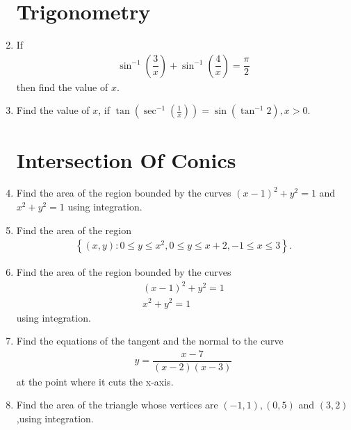 \documentclass[12pt,-letter paper]{article}
\providecommand{\cbrak}[1]{\ensuremath{\left\{#1\right\}}}
\providecommand{\brak}[1]{\ensuremath{\left(#1\right)}}
\begin{document}
\begin{enumerate}
\section{Trigonometry}

\item  If
\begin{align*}
 \sin^{-1} \brak{\dfrac{3}{x}} + \sin^{-1}\brak{\dfrac{4}{x}}=\dfrac{\pi}{2} 
\end{align*}
then find the value of $x$. 

\item Find the value of $x$, if $\tan \brak{\sec^{-1}\brak{\frac{1}{x}}} = \sin \brak{\tan^{-1}{2}},x > 0$.

\section{Intersection Of Conics}

\item Find the area of the region bounded by the curves $\brak{x-1}^{2} +y^{2} = 1$ and $ x^{2}+y^{2}  = 1$ using integration.

\item Find the area of the region 
\begin{align*}
    \cbrak{(x,y):0\leq y \leq x^{2},0 \leq y \leq x +2 , -1 \leq x \leq 3}.
\end{align*}

\item Find the area of the region bounded by the curves  
\begin{align*}
\brak{x-1}^2 +y^2=1 \\  x^2+y^2=1
\end{align*}
using integration.

\item Find the equations of the tangent and the normal to the curve 
\begin{align*}
y=\dfrac{x-7}{(x-2)(x-3)}    
\end{align*}
at the point where it cuts the x-axis.

\item Find the area of the triangle whose vertices are $\brak{-1, 1},\brak {0, 5}$ and $\brak {3, 2}$,using integration.

\end {enumerate}
\end{document}
